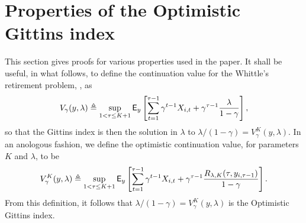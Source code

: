 \section{Properties of the Optimistic Gittins index}\label{sec:appendix_properties_of_ogi}
This section gives proofs for various properties used in the paper.  
It shall be useful, in what follows, to define the continuation value for the Whittle's retirement problem, \cite{whittle1980multi}, as
\[
V_\gamma(y, \lambda)  \triangleq \sup_{1 < \tau \le K+1} \mathsf{E}_y\left[\sum_{t=1}^{\tau-1} \gamma^{t-1} X_{i,t} + \gamma^{\tau-1} \frac{\lambda}{1-\gamma}\right],
\]
so that the Gittins index is then the solution in $\lambda$ to $\lambda/(1-\gamma) = V^K_\gamma(y, \lambda)$. In an anologous fashion, we define the optimistic continuation value, for parameters $K$ and $\lambda$, to be
\[
V^K_\gamma(y, \lambda) \triangleq \sup_{1 < \tau \le K+1} \mathsf{E}_y\left[\sum_{t=1}^{\tau-1} \gamma^{t-1}  X_{i,t} + \gamma^{\tau-1} \frac{R_{\lambda, K}(\tau, y_{i,\tau-1})}{1-\gamma}\right].
\]
From this definition, it follows that $\lambda/(1-\gamma) = V^K_\gamma(y, \lambda)$ is the Optimistic Gittins index.
